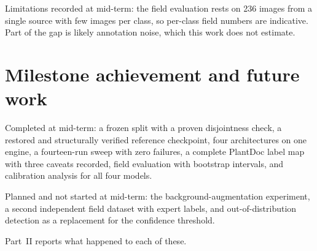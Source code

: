 Limitations recorded at mid-term: the field evaluation rests on 236 images from a
single source with few images per class, so per-class field numbers are indicative.
Part of the gap is likely annotation noise, which this work does not estimate.

\section{Milestone achievement and future work}

Completed at mid-term: a frozen split with a proven disjointness check, a restored
and structurally verified reference checkpoint, four architectures on one engine, a
fourteen-run sweep with zero failures, a complete PlantDoc label map with three
caveats recorded, field evaluation with bootstrap intervals, and calibration analysis
for all four models.

Planned and not started at mid-term: the background-augmentation experiment, a second
independent field dataset with expert labels, and out-of-distribution detection as a
replacement for the confidence threshold.

Part~II reports what happened to each of these.
